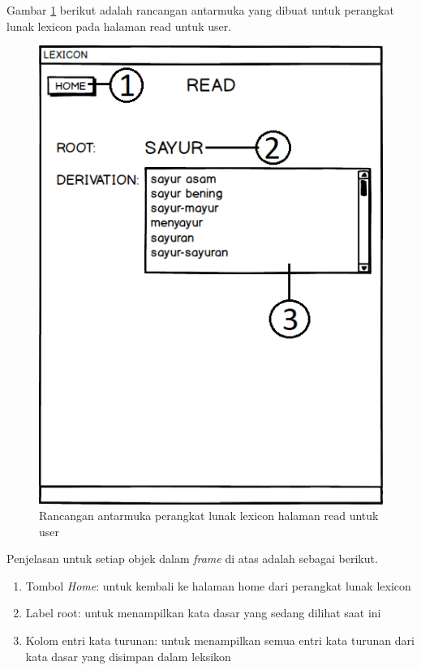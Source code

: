 Gambar \ref{mockup-lexicon-read-user} berikut adalah rancangan antarmuka yang dibuat untuk perangkat lunak lexicon pada halaman read untuk user.

\begin{figure}[H]
\centering
\includegraphics[scale=0.8]{Gambar/mockup-lexicon-read-user}
\caption{Rancangan antarmuka perangkat lunak lexicon halaman read untuk user} 
\label{mockup-lexicon-read-user}
\end{figure}

Penjelasan untuk setiap objek dalam \textit{frame} di atas adalah sebagai berikut.

\begin{enumerate}
	\item Tombol \textit{Home}: untuk kembali ke halaman home dari perangkat lunak lexicon
	\item Label root: untuk menampilkan kata dasar yang sedang dilihat saat ini
	\item Kolom entri kata turunan: untuk menampilkan semua entri kata turunan dari kata dasar yang disimpan dalam leksikon
\end{enumerate}

